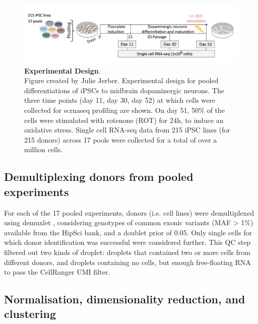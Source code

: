 \begin{figure}[h]

\includegraphics[width=16cm]{Chapter5/Fig/neuroseq_experimental_design.png}
\caption[Experimental Design]{\textbf{Experimental Design}.\\
Figure created by Julie Jerber.
Experimental design for pooled differentiations of iPSCs to midbrain dopaminergic neurons. 
The three time points (day 11, day 30, day 52) at which cells were collected for \gls{scrnaseq} profiling are shown. 
On day 51, 50\% of the cells were stimulated with rotenone (ROT) for 24h, to induce an oxidative stress.
Single cell RNA-seq data from 215 iPSC lines (for 215 donors) across 17 pools were collected for a total of over a million cells.}
\label{fig:neuroseq_experimental_design}
\end{figure}

\newpage

\subsection{Demultiplexing donors from pooled experiments}

For each of the 17 pooled experiments, donors (i.e. cell lines) were demultiplexed using demuxlet \cite{kang2018multiplexed}, considering genotypes of common exonic variants (MAF > 1\%) available from the HipSci bank, and a doublet prior of 0.05. 
Only single cells for which donor identification was successful were considered further. 
This QC step filtered out two kinds of droplet: droplets that contained two or more cells from different donors, and droplets containing no cells, but enough free-floating RNA to pass the CellRanger UMI filter.

\subsection{Normalisation, dimensionality reduction, and clustering}

